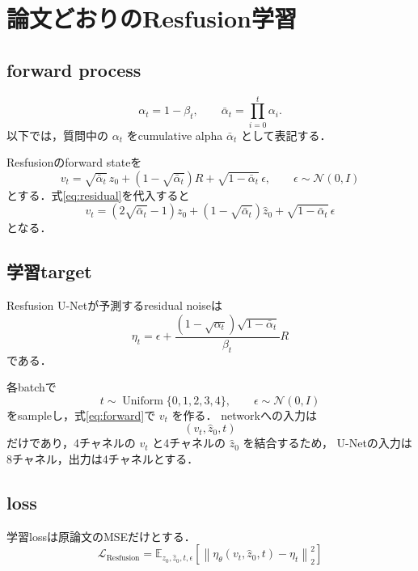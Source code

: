 \documentclass[11pt,a4paper]{ltjsarticle}
\newcommand{\E}{\mathbb{E}}
\newcommand{\N}{\mathcal{N}}
\begin{document}
\section{論文どおりのResfusion学習}

\subsection{forward process}

\[
  \alpha_t=1-\beta_t,
  \qquad
  \bar\alpha_t=\prod_{i=0}^{t}\alpha_i.
\]
以下では，質問中の \(\alpha_t\) をcumulative alpha
\(\bar\alpha_t\) として表記する．

Resfusionのforward stateを
\begin{equation}
  v_t
  =
  \sqrt{\bar\alpha_t}\,z_0
  +
  \left(1-\sqrt{\bar\alpha_t}\right)R
  +
  \sqrt{1-\bar\alpha_t}\,\epsilon,
  \qquad
  \epsilon\sim\N(0,I)
  \label{eq:forward}
\end{equation}
とする．式\eqref{eq:residual}を代入すると
\begin{equation}
  v_t
  =
  \left(2\sqrt{\bar\alpha_t}-1\right)z_0
  +
  \left(1-\sqrt{\bar\alpha_t}\right)\hat z_0
  +
  \sqrt{1-\bar\alpha_t}\,\epsilon
  \label{eq:smooth}
\end{equation}
となる．

\subsection{学習target}

Resfusion U-Netが予測するresidual noiseは
\begin{equation}
  \eta_t
  =
  \epsilon
  +
  \frac{
    \left(1-\sqrt{\alpha_t}\right)
    \sqrt{1-\bar\alpha_t}
  }{\beta_t}R
  \label{eq:resnoise}
\end{equation}
である．

各batchで
\[
  t\sim\operatorname{Uniform}\{0,1,2,3,4\},
  \qquad
  \epsilon\sim\N(0,I)
\]
をsampleし，式\eqref{eq:forward}で \(v_t\) を作る．
networkへの入力は
\[
  (v_t,\hat z_0,t)
\]
だけであり，4チャネルの \(v_t\) と4チャネルの \(\hat z_0\) を結合するため，
U-Netの入力は8チャネル，出力は4チャネルとする．

\subsection{loss}

学習lossは原論文のMSEだけとする．
\begin{equation}
\boxed{
  \mathcal L_{\mathrm{Resfusion}}
  =
  \E_{z_0,\hat z_0,t,\epsilon}
  \left[
    \left\|
      \eta_\theta(v_t,\hat z_0,t)-\eta_t
    \right\|_2^2
  \right]
}
\label{eq:loss}
\end{equation}
\end{document}
